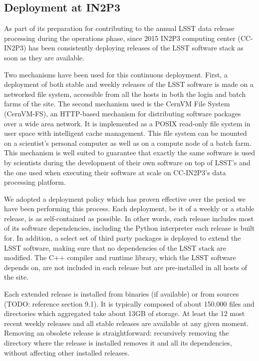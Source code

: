 \subsection{Deployment at IN2P3}

As part of its preparation for contributing to the annual LSST data release processing during the operations phase, since 2015 IN2P3 computing center (CC-IN2P3) has been consistently deploying releases of the LSST software stack as soon as they are available.

Two mechanisms have been used for this continuous deployment. First, a deployment of both stable and weekly releases of the LSST software is made on a networked file system, accessible from all the hosts in both the login and batch farms of the site. The second mechanism used is the CernVM File System (CernVM-FS)\cite{1742-6596-331-4-042003}, an HTTP-based mechanism for distributing software packages over a wide area network. It is implemented as a POSIX read-only file system in user space with intelligent cache management. This file system can be mounted on a scientist's personal computer as well as on a compute node of a batch farm. This mechanism is well suited to guarantee that exactly the same software is used by scientists during the development of their own software on top of LSST's and the one used when executing their software at scale on CC-IN2P3's data processing platform.

We adopted a deployment policy which has proven effective over the period we have been performing this process. Each deployment, be it of a weekly or a stable release, is as self-contained as possible. In other words, each release includes most of its software dependencies, including the Python interpreter each release is built for. In addition, a select set of third party packages is deployed to extend the LSST software, making sure that no dependencies of the LSST stack are modified. The C++ compiler and runtime library, which the LSST software depends on, are not included in each release but are pre-installed in all hosts of the site.

Each extended release is installed from binaries (if available) or from sources (TODO: reference section 9.1). It is typically composed of about 150.000 files and directories which aggregated take about 13GB of  storage. At least the 12 most recent weekly releases and all stable releases are available at any given moment. Removing an obsolete release is straightforward: recursively removing the directory where the release is installed removes it and all its dependencies, without affecting other installed releases.

